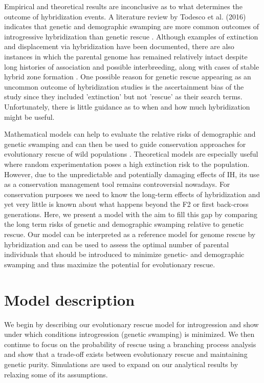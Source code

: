 \documentclass[a4paper,10pt]{article}
\begin{document}
Empirical and theoretical results are inconclusive as to what determines the outcome of hybridization events. A literature review by Todesco et al. (2016) indicates that genetic and demographic swamping are more common outcomes of introgressive hybridization than genetic rescue \cite{todesco2016hybridization}. Although examples of extinction and displacement via hybridization have been documented, there are also instances in which the parental genome has remained relatively intact despite long histories of association and possible interbreeding, along with cases of stable hybrid zone formation \cite{vila2003rescue} \cite{madsen2004novel}. One possible reason for genetic rescue appearing as an uncommon outcome of hybridization studies is the ascertainment bias of the study since they included 'extinction' but not 'rescue' as their search terms. Unfortunately, there is little guidance as to when and how much hybridization might be useful.
	
Mathematical models can help to evaluate the relative risks of demographic and genetic swamping and can then be used to guide conservation approaches for evolutionary rescue of wild populations \cite{aitken2013assisted} \cite{baskett2011introgressive}. Theoretical models are especially useful where random experimentation poses a high extinction risk to the population. However, due to the unpredictable and potentially damaging effects of IH, its use as a conservation management tool remains controversial nowadays. For conservation purposes we need to know the long-term effects of hybridization and yet very little is known about what happens beyond the F2 or first back-cross generations. Here, we present a model with the aim to fill this gap by comparing the long term risks of genetic and demographic swamping relative to genetic rescue. Our model can be interpreted as a reference model for genome rescue by hybridization and can be used to assess the optimal number of parental individuals that should be introduced to minimize genetic- and demographic swamping and thus maximize the potential for evolutionary rescue.
 
\section*{Model description}

We begin by describing our evolutionary rescue model for introgression and show under which conditions introgression (genetic swamping) is minimized. We then continue to focus on the probability of rescue using a branching process analysis and show that a trade-off exists between evolutionary rescue and maintaining genetic purity. Simulations are used to expand on our analytical results by relaxing some of its assumptions.
\end{document}
